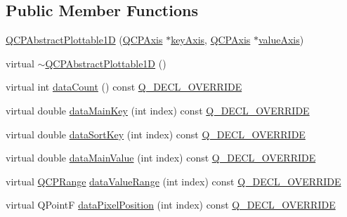 \subsection*{Public Member Functions}
\begin{DoxyCompactItemize}
\item 
\hyperlink{class_q_c_p_abstract_plottable1_d_a30b2e50ab0afce65f104ea7a95440315}{Q\+C\+P\+Abstract\+Plottable1D} (\hyperlink{class_q_c_p_axis}{Q\+C\+P\+Axis} $\ast$\hyperlink{class_q_c_p_abstract_plottable_a2cdd6f0dd5e9a979037f86b4000d9cfe}{key\+Axis}, \hyperlink{class_q_c_p_axis}{Q\+C\+P\+Axis} $\ast$\hyperlink{class_q_c_p_abstract_plottable_af47809a644a68ffd955fb30b01fb4f2f}{value\+Axis})
\item 
virtual \hyperlink{class_q_c_p_abstract_plottable1_d_afa6d5d2c971fed63bff4f4a79989a3f8}{$\sim$\+Q\+C\+P\+Abstract\+Plottable1D} ()
\item 
virtual int \hyperlink{class_q_c_p_abstract_plottable1_d_ab5dd99e4f1621e7dbd63438e0b02984e}{data\+Count} () const \hyperlink{qcustomplot_8h_a42cc5eaeb25b85f8b52d2a4b94c56f55}{Q\+\_\+\+D\+E\+C\+L\+\_\+\+O\+V\+E\+R\+R\+I\+DE}
\item 
virtual double \hyperlink{class_q_c_p_abstract_plottable1_d_aeb156ebf5d3c8de906b428be30733ad8}{data\+Main\+Key} (int index) const \hyperlink{qcustomplot_8h_a42cc5eaeb25b85f8b52d2a4b94c56f55}{Q\+\_\+\+D\+E\+C\+L\+\_\+\+O\+V\+E\+R\+R\+I\+DE}
\item 
virtual double \hyperlink{class_q_c_p_abstract_plottable1_d_aa8277da921b009bce474437d50b4a2d8}{data\+Sort\+Key} (int index) const \hyperlink{qcustomplot_8h_a42cc5eaeb25b85f8b52d2a4b94c56f55}{Q\+\_\+\+D\+E\+C\+L\+\_\+\+O\+V\+E\+R\+R\+I\+DE}
\item 
virtual double \hyperlink{class_q_c_p_abstract_plottable1_d_a6be0f657ba85a1688336d76ad649ecf2}{data\+Main\+Value} (int index) const \hyperlink{qcustomplot_8h_a42cc5eaeb25b85f8b52d2a4b94c56f55}{Q\+\_\+\+D\+E\+C\+L\+\_\+\+O\+V\+E\+R\+R\+I\+DE}
\item 
virtual \hyperlink{class_q_c_p_range}{Q\+C\+P\+Range} \hyperlink{class_q_c_p_abstract_plottable1_d_a55f937ba6a63e56e57f0b1a6e85a333a}{data\+Value\+Range} (int index) const \hyperlink{qcustomplot_8h_a42cc5eaeb25b85f8b52d2a4b94c56f55}{Q\+\_\+\+D\+E\+C\+L\+\_\+\+O\+V\+E\+R\+R\+I\+DE}
\item 
virtual Q\+PointF \hyperlink{class_q_c_p_abstract_plottable1_d_a6ca0699a6af5f25a7565de7c50ce13b2}{data\+Pixel\+Position} (int index) const \hyperlink{qcustomplot_8h_a42cc5eaeb25b85f8b52d2a4b94c56f55}{Q\+\_\+\+D\+E\+C\+L\+\_\+\+O\+V\+E\+R\+R\+I\+DE}

\end{DoxyCompactItemize}
